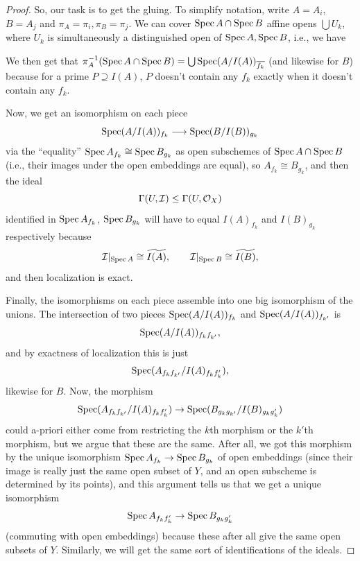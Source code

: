 \documentclass[12pt]{article}
\begin{document}
\begin{proof}
    So, our task is to get the gluing. To simplify notation, write $A=A_i$, $B=A_j$ and $\pi_A=\pi_i, \pi_B = \pi_j$. We can cover $\operatorname{Spec} A \cap \operatorname{Spec} B$ affine opens $\bigcup U_k$, where $U_k$ is simultaneously a distinguished open of $\operatorname{Spec} A, \operatorname{Spec} B$, i.e., we have
    \begin{center}
    \end{center}
    We then get that $\pi_A^{-1}(\operatorname{Spec} A \cap \operatorname{Spec} B) = \bigcup \operatorname{Spec} (A/I(A))_{\overline{f_k}}$ (and likewise for $B$) because for a prime $P \supseteq I(A)$, $P$ doesn't contain any $f_k$ exactly when it doesn't contain any $f_k$.

    Now, we get an isomorphism on each piece
    \[\operatorname{Spec} (A/I(A))_{f_k} \longrightarrow \operatorname{Spec} (B/I(B))_{g_k}\]
    via the ``equality'' $\operatorname{Spec} A_{f_k} \cong \operatorname{Spec} B_{g_k}$ as open subschemes of $\operatorname{Spec} A \cap \operatorname{Spec} B$ (i.e., their images under the open embeddings are equal), so $A_{f_k} \cong B_{g_k}$, and then the ideal
    \[\Gamma(U, \mathcal{I}) \leq \Gamma(U, \mathcal{O}_X)\]
    identified in $\operatorname{Spec} A_{f_k}$, $\operatorname{Spec} B_{g_k}$ will have to equal $I(A)_{f_k}$ and $I(B)_{g_k}$ respectively because
    \[\mathcal{I}|_{\operatorname{Spec} A} \cong \widetilde{I(A)}, \qquad \mathcal{I}|_{\operatorname{Spec} B} \cong \widetilde{I(B)},\]
    and then localization is exact.

    Finally, the isomorphisms on each piece assemble into one big isomorphism of the unions. The intersection of two pieces $\operatorname{Spec} (A/I(A))_{f_k}$ and $\operatorname{Spec} (A/I(A))_{f_{k'}}$ is
    \[\operatorname{Spec} (A/I(A))_{f_k f_{k'}},\]
    and by exactness of localization this is just
    \[\operatorname{Spec} (A_{f_k f_{k'}}/I(A)_{f_k f_k'}),\]
    likewise for $B$. Now, the morphism
    \[\operatorname{Spec} (A_{f_k f_{k'}}/I(A)_{f_k f_k'}) \to \operatorname{Spec} (B_{g_k g_{k'}}/I(B)_{g_k g_k'})\]
    could a-priori either come from restricting the $k$th morphism or the $k'$th morphism, but we argue that these are the same. After all, we got this morphism by the unique isomorphism $\operatorname{Spec} A_{f_k} \to \operatorname{Spec} B_{g_k}$ of open embeddings (since their image is really just the same open subset of $Y$, and an open subscheme is determined by its points), and this argument tells us that we get a unique isomorphism
    \[\operatorname{Spec} A_{f_k f_k'} \to \operatorname{Spec} B_{g_k g_k'}\]
    (commuting with open embeddings) because these after all give the same open subsets of $Y$. Similarly, we will get the same sort of identifications of the ideals.


\end{proof}
\end{document}
